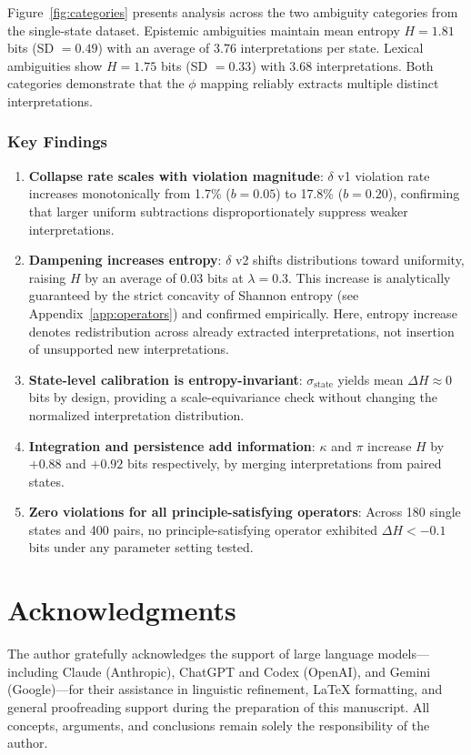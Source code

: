 \documentclass[11pt,a4paper]{article}
\begin{document}
Figure~\ref{fig:categories} presents analysis across the two 
ambiguity categories from the single-state dataset. 
Epistemic ambiguities maintain mean entropy $H = 1.81$ bits 
(SD $= 0.49$) with an average of 3.76 interpretations per state. 
Lexical ambiguities show $H = 1.75$ bits (SD $= 0.33$) with 
3.68 interpretations. Both categories demonstrate that the 
$\phi$ mapping reliably extracts multiple distinct interpretations.

\subsubsection{Key Findings}

\begin{enumerate}
    \item \textbf{Collapse rate scales with violation magnitude}: 
          $\delta$ v1 violation rate increases monotonically from 
          1.7\% ($b=0.05$) to 17.8\% ($b=0.20$), confirming that 
          larger uniform subtractions disproportionately suppress 
          weaker interpretations.
    
    \item \textbf{Dampening increases entropy}: $\delta$ v2 shifts 
          distributions toward uniformity, raising $H$ by an average 
          of 0.03 bits at $\lambda = 0.3$. This increase is 
          analytically guaranteed by the strict concavity of Shannon 
          entropy (see Appendix~\ref{app:operators}) and confirmed 
          empirically. Here, entropy increase denotes redistribution
          across already extracted interpretations, not insertion of
          unsupported new interpretations.
    
    \item \textbf{State-level calibration is entropy-invariant}: 
          $\sigma_{\mathrm{state}}$ yields mean $\Delta H \approx 0$ bits by design,
          providing a scale-equivariance check without changing the normalized
          interpretation distribution.
    
    \item \textbf{Integration and persistence add information}: 
          $\kappa$ and $\pi$ increase $H$ by $+0.88$ and $+0.92$ bits 
          respectively, by merging interpretations from paired states.
    
    \item \textbf{Zero violations for all principle-satisfying operators}: 
          Across 180 single states and 400 pairs, no principle-satisfying 
          operator exhibited $\Delta H < -0.1$ bits under any parameter 
          setting tested.
\end{enumerate}

\section*{Acknowledgments}

The author gratefully acknowledges the support of large language models---including Claude (Anthropic), ChatGPT and Codex (OpenAI), and Gemini (Google)---for their assistance in linguistic refinement, LaTeX formatting, and general proofreading support during the preparation of this manuscript.
All concepts, arguments, and conclusions remain solely the responsibility of the author.
\end{document}
